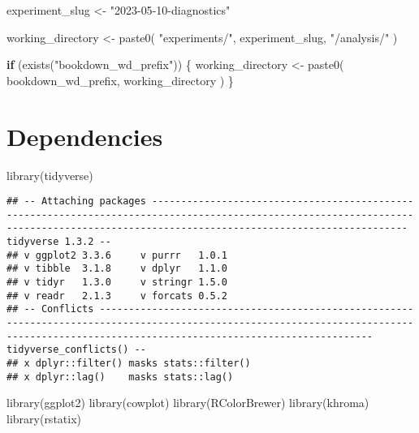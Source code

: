 \documentclass[
]{book}
\newenvironment{Shaded}{\begin{snugshade}}{\end{snugshade}}
\newcommand{\ControlFlowTok}[1]{\textcolor[rgb]{0.13,0.29,0.53}{\textbf{#1}}}
\newcommand{\FunctionTok}[1]{\textcolor[rgb]{0.00,0.00,0.00}{#1}}
\newcommand{\NormalTok}[1]{#1}
\newcommand{\OtherTok}[1]{\textcolor[rgb]{0.56,0.35,0.01}{#1}}
\newcommand{\StringTok}[1]{\textcolor[rgb]{0.31,0.60,0.02}{#1}}
\begin{document}
\begin{Shaded}
\begin{Highlighting}[]
\NormalTok{experiment\_slug }\OtherTok{\textless{}{-}} \StringTok{"2023{-}05{-}10{-}diagnostics"}

\NormalTok{working\_directory }\OtherTok{\textless{}{-}} \FunctionTok{paste0}\NormalTok{(}
  \StringTok{"experiments/"}\NormalTok{,}
\NormalTok{  experiment\_slug,}
  \StringTok{"/analysis/"}
\NormalTok{)}

\ControlFlowTok{if}\NormalTok{ (}\FunctionTok{exists}\NormalTok{(}\StringTok{"bookdown\_wd\_prefix"}\NormalTok{)) \{}
\NormalTok{  working\_directory }\OtherTok{\textless{}{-}} \FunctionTok{paste0}\NormalTok{(}
\NormalTok{    bookdown\_wd\_prefix,}
\NormalTok{    working\_directory}
\NormalTok{  )}
\NormalTok{\}}
\end{Highlighting}
\end{Shaded}

\hypertarget{dependencies}{%
\section{Dependencies}\label{dependencies}}

\begin{Shaded}
\begin{Highlighting}[]
\FunctionTok{library}\NormalTok{(tidyverse)}
\end{Highlighting}
\end{Shaded}

\begin{verbatim}
## -- Attaching packages ---------------------------------------------------------------------------------------------------------------------------------------------------------------------------------------- tidyverse 1.3.2 --
## v ggplot2 3.3.6     v purrr   1.0.1
## v tibble  3.1.8     v dplyr   1.1.0
## v tidyr   1.3.0     v stringr 1.5.0
## v readr   2.1.3     v forcats 0.5.2
## -- Conflicts ------------------------------------------------------------------------------------------------------------------------------------------------------------------------------------------- tidyverse_conflicts() --
## x dplyr::filter() masks stats::filter()
## x dplyr::lag()    masks stats::lag()
\end{verbatim}

\begin{Shaded}
\begin{Highlighting}[]
\FunctionTok{library}\NormalTok{(ggplot2)}
\FunctionTok{library}\NormalTok{(cowplot)}
\FunctionTok{library}\NormalTok{(RColorBrewer)}
\FunctionTok{library}\NormalTok{(khroma)}
\FunctionTok{library}\NormalTok{(rstatix)}
\end{Highlighting}
\end{Shaded}
\end{document}
